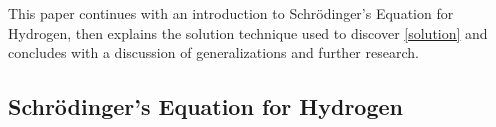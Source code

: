 \documentclass{article}
\begin{document}
This paper continues with an introduction to Schr\"odinger's Equation for Hydrogen,
then explains the solution technique used to discover \eqref{solution}
and concludes with a discussion of generalizations and further research.


\subsection*{Schr\"odinger's Equation for Hydrogen}

\end{document}

